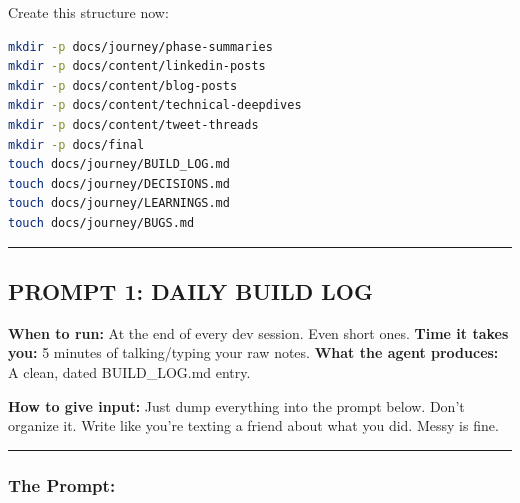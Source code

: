 \documentclass[
  11pt,
]{article}
\begin{document}
Create this structure now:

\begin{lstlisting}[language=bash]
mkdir -p docs/journey/phase-summaries
mkdir -p docs/content/linkedin-posts
mkdir -p docs/content/blog-posts
mkdir -p docs/content/technical-deepdives
mkdir -p docs/content/tweet-threads
mkdir -p docs/final
touch docs/journey/BUILD_LOG.md
touch docs/journey/DECISIONS.md
touch docs/journey/LEARNINGS.md
touch docs/journey/BUGS.md
\end{lstlisting}

\begin{center}\rule{0.5\linewidth}{0.5pt}\end{center}

\hypertarget{prompt-1-daily-build-log}{%
\subsection{PROMPT 1: DAILY BUILD LOG}\label{prompt-1-daily-build-log}}

\textbf{When to run:} At the end of every dev session. Even short ones.
\textbf{Time it takes you:} 5 minutes of talking/typing your raw notes.
\textbf{What the agent produces:} A clean, dated BUILD\_LOG.md entry.

\textbf{How to give input:} Just dump everything into the prompt below.
Don't organize it. Write like you're texting a friend about what you
did. Messy is fine.

\begin{center}\rule{0.5\linewidth}{0.5pt}\end{center}

\hypertarget{the-prompt}{%
\subsubsection{The Prompt:}\label{the-prompt}}
\end{document}
